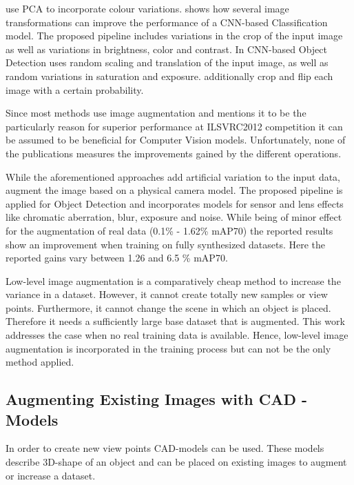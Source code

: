 \citeauthor{Krizhevsky2012a} \cite{Krizhevsky2012a} use \ac{PCA} to incorporate colour variations. \citeauthor{Howard2013} \cite{Howard2013} shows how several image transformations can improve the performance of a \ac{CNN}-based Classification model. The proposed pipeline includes variations in the crop of the input image as well as variations in brightness, color and contrast. In \ac{CNN}-based Object Detection \citeauthor{Redmon} \cite{Redmon} uses random scaling and translation of the input image, as well as random variations in saturation and exposure. \citeauthor{Liu} \cite{Liu} additionally crop and flip each image with a certain probability.

Since most methods use image augmentation and \citeauthor{Krizhevsky2012a} \cite{Krizhevsky2012a} mentions it to be the particularly reason for superior performance at ILSVRC2012 competition it can be assumed to be beneficial for Computer Vision models. Unfortunately, none of the publications measures the improvements gained by the different operations. 

While the aforementioned approaches add artificial variation to the input data, \citeauthor{Carlson2018}\cite{Carlson2018} augment the image based on a physical camera model. The proposed pipeline is applied for Object Detection and incorporates models for sensor and lens effects like chromatic aberration, blur, exposure and noise. While being of minor effect for the augmentation of real data (0.1\% - 1.62\% \ac{mAP}70) the reported results show an improvement when training on fully synthesized datasets. Here the reported gains vary between 1.26 and 6.5 \% \ac{mAP}70.

Low-level image augmentation is a comparatively cheap method to increase the variance in a dataset. However, it cannot create totally new samples or view points. Furthermore, it cannot change the scene in which an object is placed. Therefore it needs a sufficiently large base dataset that is augmented. This work addresses the case when no real training data is available. Hence, low-level image augmentation is incorporated in the training process but can not be the only method applied.

\subsection{Augmenting Existing Images with CAD - Models}

In order to create new view points \ac{CAD}-models can be used. These models describe 3D-shape of an object and can be placed on existing images to augment or increase a dataset.

